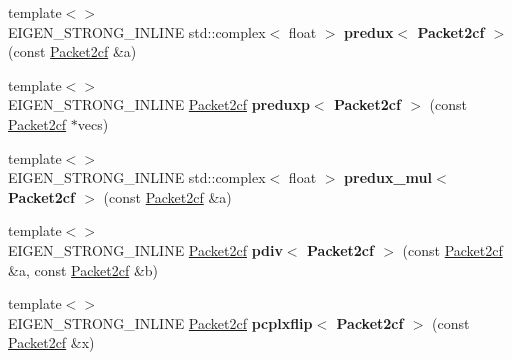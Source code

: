 \begin{DoxyCompactItemize}
\mbox{\label{namespace_eigen_1_1internal_a0ab586f7c54b9234944c042d13cba918}} 
{\footnotesize template$<$$>$ }\\E\+I\+G\+E\+N\+\_\+\+S\+T\+R\+O\+N\+G\+\_\+\+I\+N\+L\+I\+NE std\+::complex$<$ float $>$ {\bfseries predux$<$ Packet2cf $>$} (const \hyperlink{struct_eigen_1_1internal_1_1_packet2cf}{Packet2cf} \&a)
\item 
\mbox{\label{namespace_eigen_1_1internal_a150e942c8daf77d3d541c1f22d21b216}} 
{\footnotesize template$<$$>$ }\\E\+I\+G\+E\+N\+\_\+\+S\+T\+R\+O\+N\+G\+\_\+\+I\+N\+L\+I\+NE \hyperlink{struct_eigen_1_1internal_1_1_packet2cf}{Packet2cf} {\bfseries preduxp$<$ Packet2cf $>$} (const \hyperlink{struct_eigen_1_1internal_1_1_packet2cf}{Packet2cf} $\ast$vecs)
\item 
\mbox{\label{namespace_eigen_1_1internal_a0a0f0317480807aaea520f2445ee72d9}} 
{\footnotesize template$<$$>$ }\\E\+I\+G\+E\+N\+\_\+\+S\+T\+R\+O\+N\+G\+\_\+\+I\+N\+L\+I\+NE std\+::complex$<$ float $>$ {\bfseries predux\+\_\+mul$<$ Packet2cf $>$} (const \hyperlink{struct_eigen_1_1internal_1_1_packet2cf}{Packet2cf} \&a)
\item 
\mbox{\label{namespace_eigen_1_1internal_a88acae19dd76daa8a376f7eea84c3e61}} 
{\footnotesize template$<$$>$ }\\E\+I\+G\+E\+N\+\_\+\+S\+T\+R\+O\+N\+G\+\_\+\+I\+N\+L\+I\+NE \hyperlink{struct_eigen_1_1internal_1_1_packet2cf}{Packet2cf} {\bfseries pdiv$<$ Packet2cf $>$} (const \hyperlink{struct_eigen_1_1internal_1_1_packet2cf}{Packet2cf} \&a, const \hyperlink{struct_eigen_1_1internal_1_1_packet2cf}{Packet2cf} \&b)
\item 
\mbox{\label{namespace_eigen_1_1internal_ab320047acb2a711eb25b502b1d3a20d1}} 
{\footnotesize template$<$$>$ }\\E\+I\+G\+E\+N\+\_\+\+S\+T\+R\+O\+N\+G\+\_\+\+I\+N\+L\+I\+NE \hyperlink{struct_eigen_1_1internal_1_1_packet2cf}{Packet2cf} {\bfseries pcplxflip$<$ Packet2cf $>$} (const \hyperlink{struct_eigen_1_1internal_1_1_packet2cf}{Packet2cf} \&x)
\item 
\mbox{\label{namespace_eigen_1_1internal_a375fca01f8ae80efcba6793f990c7917}} 

\end{DoxyCompactItemize}
